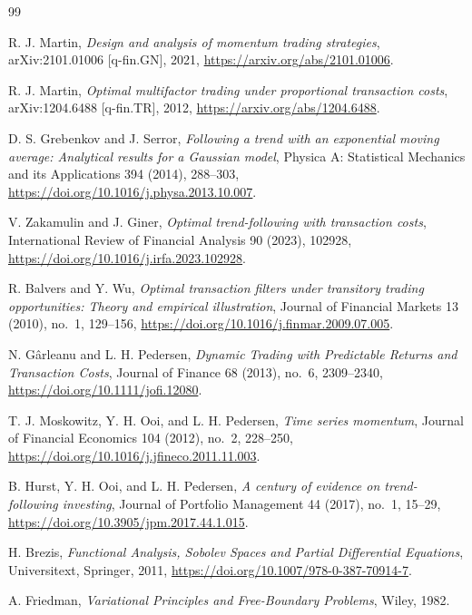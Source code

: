 \documentclass[11pt]{amsart}
\theoremstyle{definition}
\theoremstyle{remark}
\begin{document}
\begin{thebibliography}{99}

R. J. Martin,
\emph{Design and analysis of momentum trading strategies},
arXiv:2101.01006 [q-fin.GN], 2021,
\url{https://arxiv.org/abs/2101.01006}.

R. J. Martin,
\emph{Optimal multifactor trading under proportional transaction costs},
arXiv:1204.6488 [q-fin.TR], 2012,
\url{https://arxiv.org/abs/1204.6488}.

D. S. Grebenkov and J. Serror,
\emph{Following a trend with an exponential moving average: Analytical results for a Gaussian model},
Physica A: Statistical Mechanics and its Applications 394 (2014), 288--303,
\url{https://doi.org/10.1016/j.physa.2013.10.007}.

V. Zakamulin and J. Giner,
\emph{Optimal trend-following with transaction costs},
International Review of Financial Analysis 90 (2023), 102928,
\url{https://doi.org/10.1016/j.irfa.2023.102928}.

R. Balvers and Y. Wu,
\emph{Optimal transaction filters under transitory trading opportunities: Theory and empirical illustration},
Journal of Financial Markets 13 (2010), no.~1, 129--156,
\url{https://doi.org/10.1016/j.finmar.2009.07.005}.

N. Gârleanu and L. H. Pedersen,
\emph{Dynamic Trading with Predictable Returns and Transaction Costs},
Journal of Finance 68 (2013), no.~6, 2309--2340,
\url{https://doi.org/10.1111/jofi.12080}.

T. J. Moskowitz, Y. H. Ooi, and L. H. Pedersen,
\emph{Time series momentum}, Journal of Financial Economics 104 (2012),
no.~2, 228--250, \url{https://doi.org/10.1016/j.jfineco.2011.11.003}.

B. Hurst, Y. H. Ooi, and L. H. Pedersen,
\emph{A century of evidence on trend-following investing}, Journal of Portfolio
Management 44 (2017), no.~1, 15--29,
\url{https://doi.org/10.3905/jpm.2017.44.1.015}.

H. Brezis, \emph{Functional Analysis, Sobolev Spaces and Partial Differential
Equations}, Universitext, Springer, 2011,
\url{https://doi.org/10.1007/978-0-387-70914-7}.

A. Friedman, \emph{Variational Principles and Free-Boundary Problems}, Wiley,
1982.


\end{thebibliography}
\end{document}
